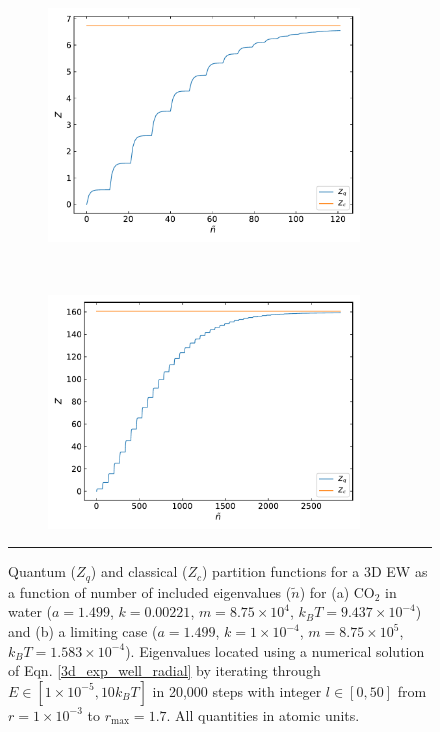 \documentclass[../main.tex]{subfiles}
\begin{document}
\vspace{0.2cm}
\begin{figure}[h!]
	\begin{subfigure}[t]{0.5\textwidth}
		\centering
		\includegraphics[height=6.2cm]{4/figs/figX7/quantum_classical_comparison_co2.pdf}
		\caption{}
	\end{subfigure}%
	~ 
	\begin{subfigure}[t]{0.5\textwidth}
		\centering
		\includegraphics[height=6.2cm]{4/figs/figX7/quantum_classical_comparison_limiting.pdf}
		\caption{}
	\end{subfigure}
	\vspace{0.2cm}
	\hrule
	\caption{Quantum ($Z_q$) and classical ($Z_c$) partition functions for a 3D EW as a function of number of included eigenvalues ($\tilde{n}$) for (a) CO$_2$ in water ($a = 1.499$, $k=0.00221$, $m=8.75 \times 10^4$, $k_BT = 9.437 \times 10^{-4}$) and (b) a limiting case ($a = 1.499$, $k=1\times 10^{-4}$, $m=8.75 \times 10^5$, $k_BT = 1.583 \times 10^{-4}$). Eigenvalues located using a numerical solution of Eqn. \eqref{3d_exp_well_radial} by iterating through $E \in [1\times10^{-5}, 10 k_BT]$ in 20,000 steps with integer $l \in [0, 50]$ from $r = 1\times10^{-3}$ to $r_\text{max} = 1.7$. All quantities in atomic units. 
	} 
	\label{fig::entropy_X7}
\end{figure}
\end{document}
